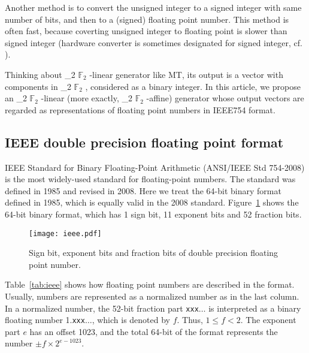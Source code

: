 \documentclass{svmult}
\def\bbf2{\ifmmode \mathbb{F}_2 \else $\mathbb{F}_2$ \fi}
\begin{document}
Another method is to convert the unsigned integer to 
a signed integer with same number of bits,
and then to a (signed) floating point number.
This method is often fast, because coverting unsigned
integer to floating point is slower than signed integer 
(hardware converter is sometimes designated for signed integer,
cf. \cite{doornik}). 

Thinking about \bbf2-linear generator like MT, its output is 
a vector with components in \bbf2, considered as
a binary integer. In this article, we propose an \bbf2-linear 
(more exactly, \bbf2-affine) generator whose
output vectors are regarded as representations 
of floating point numbers in IEEE754 format. 

\subsection{IEEE double precision floating point format}
\label{sec:ieee}

IEEE Standard for Binary Floating-Point Arithmetic (ANSI/IEEE Std
754-2008)\cite{ieee754} is the most widely-used standard for
floating-point numbers. The standard was defined in 1985 and revised
in 2008. Here we treat the 64-bit binary format defined in 1985,
which is equally valid in the 2008 standard. Figure~\ref{fig:ieee}
shows the 64-bit binary format, which has 1 sign bit, 11 exponent bits
and 52 fraction bits.

\begin{figure}
  \begin{center}
    \texttt{[image: ieee.pdf]}
    \caption{Sign bit, exponent bits and fraction bits of double
      precision floating point number.}
    \label{fig:ieee}
  \end{center}
\end{figure}

Table~\ref{tab:ieee} shows how floating point numbers are described in
the format. Usually, numbers are represented as a normalized
number as in the last column. In a normalized number, 
the 52-bit fraction part \texttt{xxx}$\ldots$ is interpreted
as a binary floating number 1.\texttt{xxx}$\ldots$, which 
is denoted by $f$. Thus, $1 \le f < 2$.
The exponent part $e$ has an offset 1023, 
and the total 64-bit of the format represents the number
$\pm f \times 2^{e - 1023}$. 
\end{document}
